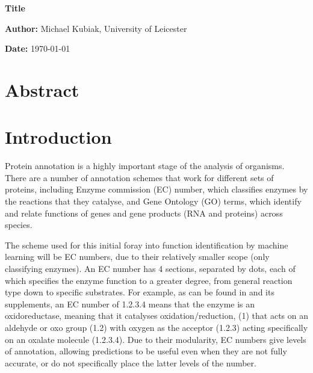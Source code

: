 \documentclass{report}
\begin{document}
	\vspace*{\fill}
		\begin{center}
			\huge\textbf{Title}

			\vspace*{2cm}
			
			\large\textbf{Author:} Michael Kubiak, University of Leicester

			\vspace*{.5cm}

			\textbf{Date:} \today
			
		
		\end{center}
	\vspace*{\fill}

\pagebreak

	\section*{Abstract}
		
		
		
\pagebreak

	\tableofcontents

\pagebreak

	\section{Introduction}
		Protein annotation is a highly important stage of the analysis of organisms.  There are a number of annotation schemes that work for different sets of proteins, including Enzyme commission (EC) number, which classifies enzymes by the reactions that they catalyse, and Gene Ontology (GO) terms, which identify and relate functions of genes and gene products (RNA and proteins) across species.  
		
		The scheme used for this initial foray into function identification by machine learning will be EC numbers, due to their relatively smaller scope (only classifying enzymes).  An EC number has 4 sections, separated by dots, each of which specifies the enzyme function to a greater degree, from general reaction type down to specific substrates. For example, as can be found in \citep{RefWorks:doc:5d70e98ce4b0ef464262611a} and its supplements, an EC number of 1.2.3.4 means that the enzyme is an oxidoreductase, meaning that it catalyses oxidation/reduction, (1) that acts on an aldehyde or oxo group (1.2) with oxygen as the acceptor (1.2.3) acting specifically on an oxalate molecule (1.2.3.4).  Due to their modularity, EC numbers give levels of annotation, allowing predictions to be useful even when they are not fully accurate, or do not specifically place the latter levels of the number.%
		
\end{document}
